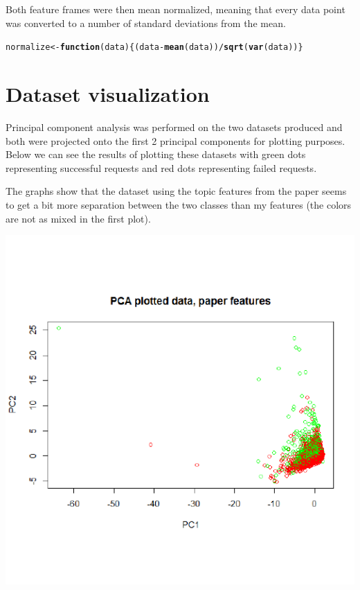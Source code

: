 \documentclass{article}\usepackage[]{graphicx}\usepackage[]{color}
\makeatletter
\def\maxwidth{ %
  \ifdim\Gin@nat@width>\linewidth
    \linewidth
  \else
    \Gin@nat@width
  \fi
}
\newcommand{\hlopt}[1]{\textcolor[rgb]{0,0,0}{#1}}%
\newcommand{\hlstd}[1]{\textcolor[rgb]{0.345,0.345,0.345}{#1}}%
\newcommand{\hlkwa}[1]{\textcolor[rgb]{0.161,0.373,0.58}{\textbf{#1}}}%
\newcommand{\hlkwb}[1]{\textcolor[rgb]{0.69,0.353,0.396}{#1}}%
\newcommand{\hlkwc}[1]{\textcolor[rgb]{0.333,0.667,0.333}{#1}}%
\newcommand{\hlkwd}[1]{\textcolor[rgb]{0.737,0.353,0.396}{\textbf{#1}}}%
\newenvironment{kframe}{%
 \def\at@end@of@kframe{}%
 \ifinner\ifhmode%
  \def\at@end@of@kframe{\end{minipage}}%
  \begin{minipage}{\columnwidth}%
 \fi\fi%
 \def\FrameCommand##1{\hskip\@totalleftmargin \hskip-\fboxsep
 \colorbox{shadecolor}{##1}\hskip-\fboxsep
     \hskip-\linewidth \hskip-\@totalleftmargin \hskip\columnwidth}%
 \MakeFramed {\advance\hsize-\width
   \@totalleftmargin\z@ \linewidth\hsize
   \@setminipage}}%
 {\par\unskip\endMakeFramed%
 \at@end@of@kframe}
\newenvironment{knitrout}{}{} %
\makeatother
\begin{document}
Both feature frames were then mean normalized, meaning that every data point was converted to a number of standard deviations from the mean.

\begin{knitrout}
\color{fgcolor}\begin{kframe}
\begin{alltt}
\hlstd{normalize} \hlkwb{<-} \hlkwa{function}\hlstd{(}\hlkwc{data}\hlstd{) \{(data} \hlopt{-} \hlkwd{mean}\hlstd{(data))}\hlopt{/}\hlkwd{sqrt}\hlstd{(}\hlkwd{var}\hlstd{(data))\}}
\end{alltt}
\end{kframe}
\end{knitrout}

\newpage

\section{Dataset visualization}

Principal component analysis was performed on the two datasets produced and both were projected onto the first 2 principal components for plotting purposes. Below we can see the results of plotting these datasets with green dots representing successful requests and red dots representing failed requests. 

The graphs show that the dataset using the topic features from the paper seems to get a bit more separation between the two classes than my features (the colors are not as mixed in the first plot).

\begin{knitrout}
\color{fgcolor}

{\centering \includegraphics[width=\maxwidth]{figure/unnamed-chunk-11-1} 

}



\end{knitrout}
\end{document}
